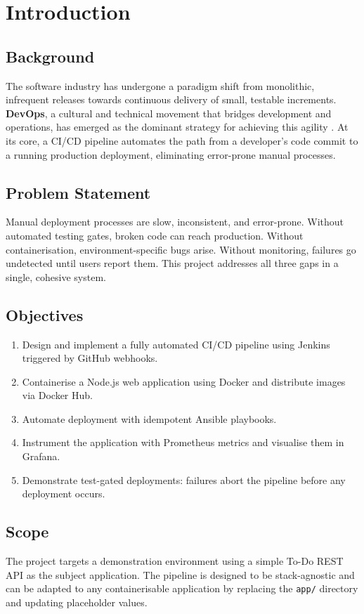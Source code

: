 \documentclass[12pt,a4paper]{report}
\begin{document}
\chapter{Introduction}

\section{Background}
The software industry has undergone a paradigm shift from monolithic, infrequent releases towards continuous delivery of small, testable increments. \textbf{DevOps}, a cultural and technical movement that bridges development and operations, has emerged as the dominant strategy for achieving this agility \cite{kim2016devops}. At its core, a CI/CD pipeline automates the path from a developer's code commit to a running production deployment, eliminating error-prone manual processes.

\section{Problem Statement}
Manual deployment processes are slow, inconsistent, and error-prone. Without automated testing gates, broken code can reach production. Without containerisation, environment-specific bugs arise. Without monitoring, failures go undetected until users report them. This project addresses all three gaps in a single, cohesive system.

\section{Objectives}
\begin{enumerate}
    \item Design and implement a fully automated CI/CD pipeline using Jenkins triggered by GitHub webhooks.
    \item Containerise a Node.js web application using Docker and distribute images via Docker Hub.
    \item Automate deployment with idempotent Ansible playbooks.
    \item Instrument the application with Prometheus metrics and visualise them in Grafana.
    \item Demonstrate test-gated deployments: failures abort the pipeline before any deployment occurs.
\end{enumerate}

\section{Scope}
The project targets a demonstration environment using a simple To-Do REST API as the subject application. The pipeline is designed to be stack-agnostic and can be adapted to any containerisable application by replacing the \texttt{app/} directory and updating placeholder values.
\end{document}
